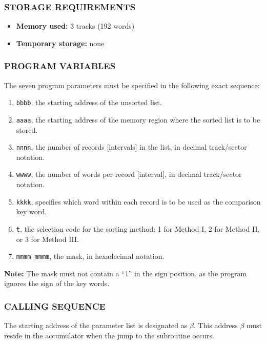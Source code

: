 \subsubsection*{STORAGE REQUIREMENTS}
\begin{itemize}
    \item[] \textbf{Memory used:} 3 tracks (192 words)
    \item[] \textbf{Temporary storage:} none
\end{itemize}

\subsubsection*{PROGRAM VARIABLES}
The seven program parameters must be specified in the following exact sequence:
\begin{enumerate}
    \item \texttt{bbbb}, the starting address of the unsorted list.
    \item \texttt{aaaa}, the starting address of the memory region where the sorted list is to be stored.
    \item \texttt{nnnn}, the number of records [intervals] in the list, in decimal track/sector notation.
    \item \texttt{wwww}, the number of words per record [interval], in decimal track/sector notation.
    \item \texttt{kkkk}, specifies which word within each record is to be used as the comparison key word.
    \item \texttt{t}, the selection code for the sorting method: 1 for Method I, 2 for Method II, or 3 for Method III.
    \item \texttt{mmmm mmmm}, the mask, in hexadecimal notation.
\end{enumerate}

\noindent \textbf{Note:} The mask must not contain a ``1'' in the sign position, as the program ignores the sign of the key words.

\subsubsection*{CALLING SEQUENCE}
The starting address of the parameter list is designated as $\beta$. This address $\beta$ must reside in the accumulator when the jump to the subroutine occurs.

